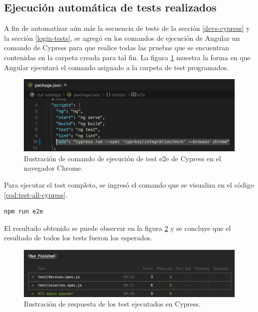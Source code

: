 \newpage

\subsection{Ejecución automática de tests realizados }

A fin de automatizar aún más la secuencia de tests de la sección \ref{devs-cypress} y la sección \ref{login-tests}, se agregó en los comandos de ejecución de Angular un comando de Cypress para que realice todas las pruebas que se encuentran contenidas en la carpeta creada para tal fin.  La figura \ref{fig:cmd-e2e} muestra la forma en que Angular ejecutará el comando asignado a la carpeta de test programados. 

\begin{figure}[htpb]
	\centering
	\includegraphics[scale=.50]{./Figures/cmd-e2e.png}
	\caption[Comando en Angular para ejecución de test de Cypress]{Ilustración de comando de ejecución de test e2e de Cypress en el navegador Chrome.}
	\label{fig:cmd-e2e}
\end{figure}


Para ejecutar el test completo, se ingresó el comando que se visualiza en el código \ref{cod:test-all-cypress}.

\begin{lstlisting}[label=cod:test-all-cypress,caption=Comando ejecutado para comienzo de tests programados en cypress.] 
npm run e2e
\end{lstlisting}

\pagebreak
El resultado obtenido se puede observar en la figura \ref{fig:test-all} y se concluye que el resultado de todos los tests fueron los esperados.

\begin{figure}[htpb]
	\centering
	\includegraphics[scale=.45]{./Figures/test-all.png}
	\caption[Resultados de los test ejecutados en Cypress]{Ilustración de respuesta de los test ejecutados en Cypress.}
	\label{fig:test-all}
\end{figure}
